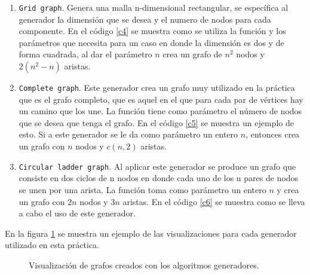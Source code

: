 \documentclass[12pt]{article}
\begin{document}
\begin{enumerate}[\hspace*{0.0cm}]
\item \texttt{Grid graph}. Genera una malla n-dimensional rectangular, se específica al generador la dimensión que se desea y el numero de nodos para cada componente. En el código \ref{c4} se muestra como se utiliza la función y los parámetros que necesita para un caso en donde la dimensión es dos y de forma cuadrada, al dar el parámetro $n$ crea un grafo de $n^2$ nodos y $2(n^2-n)$ aristas. 

 \label{c4}


\item \texttt{Complete graph}. Este generador crea un grafo muy utilizado en la práctica que es el grafo completo, que es aquel en el que para cada par de vértices hay un camino que los une. La función tiene como parámetro el número de nodos que se desea que tenga el grafo. En el código \ref{c5} se muestra un ejemplo de esto. Si a este generador se le da como parámetro un entero $n$, entonces crea un grafo con $n$ nodos y $c(n,2)$ aristas.

 \label{c5}

 
\item \texttt{Circular ladder graph}. Al aplicar este generador se produce un grafo que consiste en dos ciclos de n nodos en donde cada uno de los n pares de nodos se unen por una arista. La función toma como parámetro un entero $n$ y crea un grafo con $2n$ nodos y $3n$ aristas. En el código \ref{c6} se muestra como se lleva a cabo el uso de este generador. 

 \label{c6}


\end{enumerate}

En la figura \ref{f1} se muestra un ejemplo de las visualizaciones para cada generador utilizado en esta práctica. 

\begin{figure}[H]
\centering
{}\hspace{2mm} 
\vspace{2mm}
\hspace{2mm}
\caption{Visualización de grafos creados con los algoritmos generadores.} \label{f1}
\end{figure}
\end{document}
